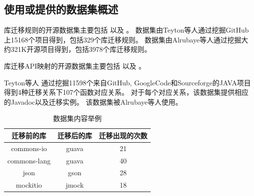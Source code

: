 \documentclass[UTF8]{ctexart}
\begin{document}




\subsection{使用或提供的数据集概述}



库迁移规则的开源数据集主要包括 \cite{library2014} 以及 \cite{library2019}。
数据集\cite{library2014}由Teyton等人\cite{2014JournalOfSysAndSoft-Teyton-Study}通过挖掘GitHub上15168个项目得到，包括329个库迁移规则。
数据集\cite{library2019}由Alrubaye等人\cite{2019ICSME-Alrubaye-MigrationMiner}通过挖掘大约321K开源项目得到，包括3978个库迁移规则。


库迁移API映射的开源数据集主要包括 \cite{API2013} 以及 \cite{API2018}。

Teyton等人\cite{2013WCRE-Teyton-Automatic} \cite{API2013} 通过挖掘11598个来自GitHub, GoogleCode和Sourceforge的JAVA项目得到4种迁移关系下107个函数对应关系。
对于每个对应关系，该数据集提供相应的Javadoc以及迁移实例。
该数据集被Alrubaye等人\cite{2019ICSME-Alrubaye-MigrationMiner}使用。

\begin{table}  
    \begin{center}
    \caption{数据集\cite{API2013}内容举例}
    \label{table_API2013} 
    \begin{tabular}{| c | c | c |}
        \hline 
        迁移前的库 & 迁移后的库 & 迁移出现的次数  \\
        \hline
        commons-io  & guava & 21 \\
        commons-lang  & guava & 40 \\ 
        json & gson & 28 \\
        mockitio  & jmock & 18 \\
        \hline
    \end{tabular}
    \end{center}
\end{table}
\end{document}
